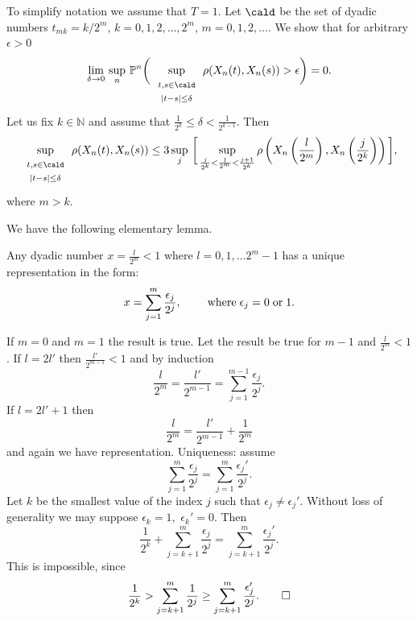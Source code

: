 \documentclass[preprint]{imsart}
\def\P{\mathbb P}
\def\N{\mathbb N}
\begin{document}
{
To simplify notation we assume that $T=1$. Let $\cald$
be the set of dyadic numbers $t_{mk}=k/2^m$,
$k=0,1,2,\ldots,2^m$, $m=0,1,2,\ldots $. We show that
for arbitrary $\epsilon >0$
$$
\lim_{\delta\to 0}\, \sup_n\, \P^n \bigg(
\sup_{
\begin{array}{c}
\begin{scriptstyle}
 t,s\in \cald
\end{scriptstyle}
 \\ \begin{scriptstyle}
|t-s|\leq \delta
 \end{scriptstyle}
\end{array}
}
\rho(X_n(t),X_n(s)) > \epsilon\bigg) =0.
$$
Let us fix $k\in\N$ and assume that $\frac{1}{2^k}\leq
\delta <\frac{1}{2^{k-1}}$. Then
$$
\sup_{
\begin{array}{c}
\begin{scriptstyle}
 t,s\in \cald
\end{scriptstyle}
 \\ \begin{scriptstyle}
|t-s|\leq \delta
 \end{scriptstyle}
\end{array}
}
\rho(X_n(t),X_n(s)) \leq 3 \sup_j\,
\bigg[ \sup_{\frac{j}{2^k} <\frac{l}{2^m} <\frac{j+1}{2^k}}
\rho\left(X_n\left(\frac{l}{2^m} \right),
X_n\left(\frac{j}{2^k} \right)\right) \bigg],
$$
where $m>k$.

We have the following elementary lemma.
\begin{Lemma}\label{dyadic}
Any dyadic number $x=\frac{l}{2^m}<1$ where
$l=0,1,\ldots 2^m-1$ has a unique representation in the
form:
$$
x= \sum_{j=1}^m \frac{\epsilon_j}{2^j},
\qquad {\; \rm where\;} \epsilon_j =0 {\rm \; or\;} 1.
$$
\end{Lemma}
If $m=0$ and $m=1$ the result is true. Let the result
be true for $m-1$ and $\frac{l}{2^m}<1$. If $l=2l'$
then  $\frac{l'}{2^{m-1}}<1$ and by induction
$$
 \frac{l}{2^m}=\frac{l'}{2^{m-1}} =
 \sum_{j=1}^{m-1}\frac{\epsilon_j}{2^j}.
$$
If $l=2l'+1$ then
$$
 \frac{l}{2^m}=\frac{l'}{2^{m-1}} +
  \frac{1}{2^m}
$$
and again we have representation.
Uniqueness: assume
$$
\sum_{j=1}^{m}\frac{\epsilon_j}{2^{j}}
=\sum_{j=1}^{m}\frac{\epsilon_j'}{2^{j}}.
$$
Let $k$ be the smallest value of the index $j$ such
that $\epsilon_j \neq \epsilon_j'$. Without loss of
generality we may suppose $\epsilon_k =1,$
$\epsilon_k'=0$. Then
$$
\frac{1}{2^{k}}+\sum_{j=k+1}^{m}\frac{\epsilon_j}{2^{j}}
=\sum_{j=k+1}^{m}\frac{\epsilon_j'}{2^{j}}.
$$
This is impossible, since
$$
\frac{1}{2^{k}} >
\sum_{j=k+1}^{m}\frac{1}{2^{j}}\geq
\sum_{j=k+1}^{m}\frac{\epsilon_j'}{2^{j}}.
\qed
$$



}
\end{document}
